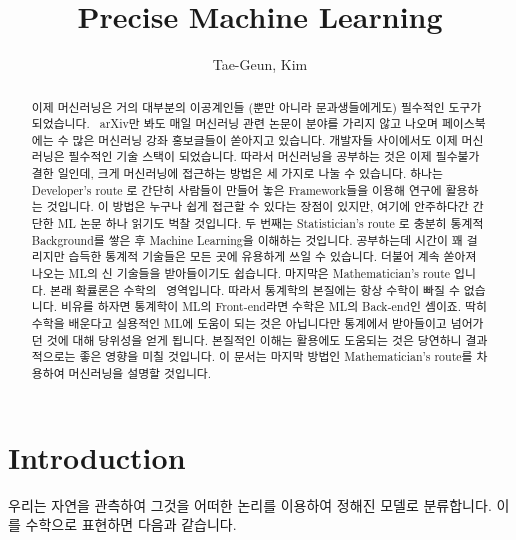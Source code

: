 \documentclass[final]{IEEEphot}
\begin{document}
\title{Precise Machine Learning}

\author{Tae-Geun, Kim}


\maketitle


\begin{abstract}
    이제 머신러닝은 거의 대부분의 이공계인들 (뿐만 아니라 문과생들에게도) 필수적인 도구가 되었습니다. 
    arXiv만 봐도 매일 머신러닝 관련 논문이 분야를 가리지 않고 나오며 페이스북에는 수 많은 머신러닝 강좌 홍보글들이 쏟아지고 있습니다. 
    개발자들 사이에서도 이제 머신러닝은 필수적인 기술 스택이 되었습니다. 따라서 머신러닝을 공부하는 것은 이제 필수불가결한 일인데, 크게 머신러닝에 접근하는 방법은 세 가지로 나눌 수 있습니다. 하나는 Developer's route 로 간단히 사람들이 만들어 놓은 Framework들을 이용해 연구에 활용하는 것입니다. 
    이 방법은 누구나 쉽게 접근할 수 있다는 장점이 있지만, 여기에 안주하다간 간단한 ML 논문 하나 읽기도 벅찰 것입니다. 
    두 번째는 Statistician's route 로 충분히 통계적 Background를 쌓은 후 Machine Learning을 이해하는 것입니다. 
    공부하는데 시간이 꽤 걸리지만 습득한 통계적 기술들은 모든 곳에 유용하게 쓰일 수 있습니다. 더불어 계속 쏟아져 나오는 ML의 신 기술들을 받아들이기도 쉽습니다. 
    마지막은 Mathematician's route 입니다. 본래 확률론은 수학의  영역입니다. 따라서 통계학의 본질에는 항상 수학이 빠질 수 없습니다. 
    비유를 하자면 통계학이 ML의 Front-end라면 수학은 ML의 Back-end인 셈이죠. 
    딱히 수학을 배운다고 실용적인 ML에 도움이 되는 것은 아닙니다만 통계에서 받아들이고 넘어가던 것에 대해 당위성을 얻게 됩니다. 
    본질적인 이해는 활용에도 도움되는 것은 당연하니 결과적으로는 좋은 영향을 미칠 것입니다. 이 문서는 마지막 방법인 Mathematician's route를 차용하여 머신러닝을 설명할 것입니다. 
\end{abstract}

\tableofcontents

\newpage

\section[Introduction]{Introduction}

\HS 우리는 자연을 관측하여 그것을 어떠한 논리를 이용하여 정해진 모델로 분류합니다. 이를 수학으로 표현하면 다음과 같습니다.
\end{document}
